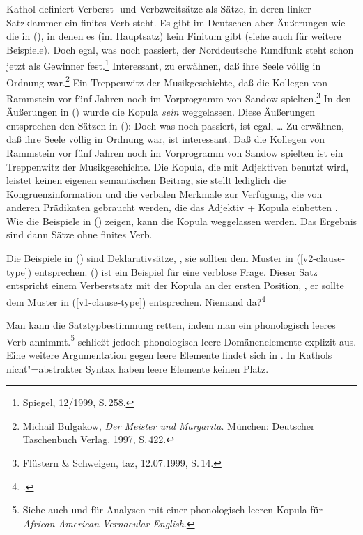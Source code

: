 Kathol definiert Verberst- und Verbzweitsätze als Sätze, in deren linker Satzklammer
ein finites Verb steht. Es gibt im Deutschen aber Äußerungen wie die in (),
in denen es (im Hauptsatz) kein Finitum gibt (siehe auch  für weitere
Beispiele).
\eal
\ex Doch egal,      was  noch  passiert, der Norddeutsche Rundfunk             steht  schon   jetzt als Gewinner fest.\footnote{
        Spiegel, 12/1999, S.\,258.
}
\ex Interessant, zu erwähnen, daß ihre Seele völlig    in Ordnung war.\footnote{
        Michail Bulgakow, \emph{Der Meister und Margarita}. München: Deutscher Taschenbuch Verlag. 1997, S.\,422.
      }
\ex Ein Treppenwitz der    Musikgeschichte, daß die Kollegen   von Rammstein vor    fünf Jahren noch im      Vorprogramm   von Sandow spielten.\footnote{
        Flüstern \& Schweigen, taz, 12.07.1999, S.\,14. %
}
\zl
In den Äußerungen in () wurde die Kopula {\em sein\/} weggelassen.
Diese Äußerungen entsprechen den Sätzen in ():
\eal
\ex Doch was noch passiert, ist egal, \ldots
\ex Zu erwähnen, daß ihre Seele völlig in Ordnung war, ist interessant.
\ex Daß die Kollegen von Rammstein vor fünf Jahren noch im Vorprogramm von Sandow spielten ist ein Treppenwitz der Musikgeschichte.
\zl
Die Kopula, die mit Adjektiven benutzt wird, leistet keinen eigenen semantischen Beitrag,
sie stellt lediglich die Kongruenzinformation und die verbalen Merkmale zur Verfügung, die von anderen Prädikaten
gebraucht werden, die das Adjektiv + Kopula einbetten \citep[]{Paul1919a}.
Wie die Beispiele in () zeigen, kann die Kopula weggelassen werden. Das Ergebnis sind dann
Sätze ohne finites Verb.

Die Beispiele in () sind Deklarativsätze, \dash, sie sollten dem Muster in
(\ref{v2-clause-type}) entsprechen. () ist ein Beispiel für eine verblose Frage.
Dieser Satz entspricht einem Verberstsatz mit der Kopula an der ersten Position,
\dash, er sollte dem Muster in (\ref{v1-clause-type}) entsprechen.
\ea
Niemand da?\footnote{
        .
}
\z

\noindent
Man kann die Satztypbestimmung retten, indem man ein phonologisch leeres Verb annimmt.\footnote{
  Siehe auch  und  für Analysen
  mit einer phonologisch leeren Kopula für \emph{African American Vernacular English}.%
}
 schließt jedoch phonologisch leere Domänenelemente explizit aus.
Eine weitere Argumentation gegen leere Elemente findet sich in .
In Kathols nicht"=abstrakter Syntax haben leere Elemente keinen Platz.

